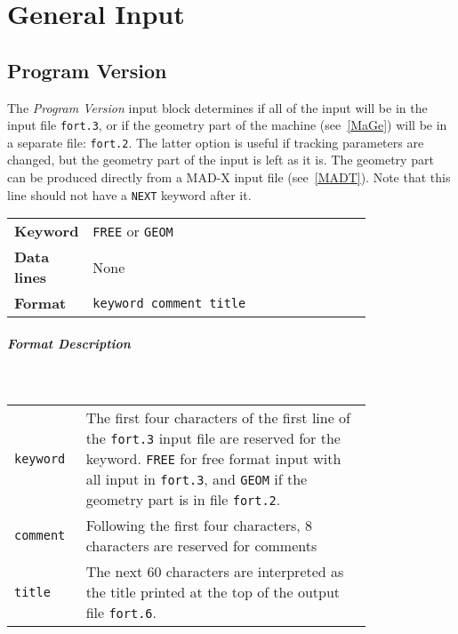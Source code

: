 
\chapter{General Input} \label{GenInp}

\section{Program Version} \label{ProVer}

The \textit{Program Version} input block determines if all of the input will be in the input file \texttt{fort.3}, or if the geometry part of the machine (see~\ref{MaGe}) will be in a separate file: \texttt{fort.2}.
The latter option is useful if tracking parameters are changed, but the geometry part of the input is left as it is.
The geometry part can be produced directly from a MAD-X input file (see~\ref{MADT}).
Note that this line should not have a \texttt{NEXT} keyword after it.

\bigskip
\begin{tabular}{@{}lp{0.8\linewidth}}
    \textbf{Keyword}    & \texttt{FREE} or \texttt{GEOM} \index{FREE}\index{GEOM}\\
    \textbf{Data lines} & None \\
    \textbf{Format}     & \texttt{keyword comment title} \\
\end{tabular}

\paragraph{Format Description}~

\bigskip
\begin{tabular}{@{}lp{0.8\linewidth}}
    \texttt{keyword} & The first four characters of the first line of the \texttt{fort.3} input file are reserved for the keyword. \texttt{FREE} for free format input with all input in \texttt{fort.3}, and \texttt{GEOM} if the geometry part is in file  \texttt{fort.2}. \\
    \texttt{comment} & Following the first four characters, 8 characters are reserved for comments \\
    \texttt{title}   & The next 60 characters are interpreted as the title printed at the top of the output file \texttt{fort.6}.
\end{tabular}

